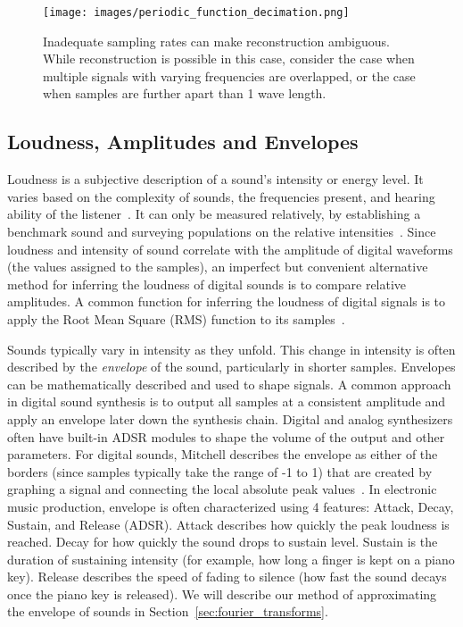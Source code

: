 \documentclass[\main/thesis.tex]{subfiles}
\begin{document}
\begin{figure}[tbp]

\centering
\texttt{[image: images/periodic\_function\_decimation.png]}
\caption{Inadequate sampling rates can make reconstruction ambiguous. While reconstruction is possible in this case, consider the case when multiple signals with varying frequencies are overlapped, or the case when samples are further apart than 1 wave length.} 
\label{fig_sampling_rate}
\end{figure}


\subsection{Loudness, Amplitudes and Envelopes}
\label{sec:adsr}
Loudness is a subjective description of a sound's intensity or energy level. It varies based on the complexity of sounds, the frequencies present, and hearing ability of the listener~\cite{fletcher1933loudness,cook1999chap6}. It can only be measured relatively, by establishing a benchmark sound and surveying populations on the relative intensities~\cite{cook1999chap6}. Since loudness and intensity of sound correlate with the amplitude of digital waveforms (the values assigned to the samples), an imperfect but convenient alternative method for inferring the loudness of digital sounds is to compare relative amplitudes. A common function for inferring the loudness of digital signals is to apply the Root Mean Square (RMS) function to its samples~\cite{zwicker1977procedure}. 

Sounds typically vary in intensity as they unfold. This change in intensity is often described by the \textit{envelope} of the sound, particularly in shorter samples. Envelopes can be mathematically described and used to shape signals. A common approach in digital sound synthesis is to output all samples at a consistent amplitude and apply an envelope later down the synthesis chain. Digital and analog synthesizers often have built-in ADSR modules to shape the volume of the output and other parameters. For digital sounds, Mitchell describes the envelope as either of the borders (since samples typically take the range of -1 to 1) that are created by graphing a signal and connecting the local absolute peak values~\cite{mitchell2009basicsynthChap6}. In electronic music production, envelope is often characterized using 4 features: Attack, Decay, Sustain, and Release (ADSR). Attack describes how quickly the peak loudness is reached. Decay for how quickly the sound drops to sustain level. Sustain is the duration of sustaining intensity (for example, how long a finger is kept on a piano key). Release describes the speed of fading to silence (how fast the sound decays once the piano key is released). We will describe our method of approximating the envelope of sounds in Section~\ref{sec:fourier_transforms}.
\end{document}
